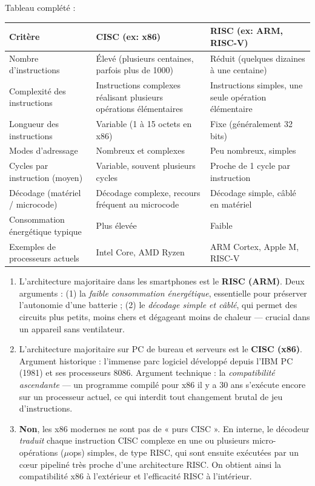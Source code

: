 \documentclass[11pt]{article}
\newcommand{\cle}[1]{{\popxbold\color{popdark}#1}}
\begin{document}
\begin{corrige}
Tableau complété :
\begin{center}
\begin{tabularx}{\linewidth}{|l|X|X|}
\hline
\rowcolor{popblueL}
\textbf{Critère} & \textbf{CISC (ex: x86)} & \textbf{RISC (ex: ARM, RISC-V)} \\ \hline
Nombre d'instructions & Élevé (plusieurs centaines, parfois plus de 1000) & Réduit (quelques dizaines à une centaine) \\ \hline
Complexité des instructions & Instructions complexes réalisant plusieurs opérations élémentaires & Instructions simples, une seule opération élémentaire \\ \hline
Longueur des instructions & Variable (1 à 15 octets en x86) & Fixe (généralement 32 bits) \\ \hline
Modes d'adressage & Nombreux et complexes & Peu nombreux, simples \\ \hline
Cycles par instruction (moyen) & Variable, souvent plusieurs cycles & Proche de 1 cycle par instruction \\ \hline
Décodage (matériel / microcode) & Décodage complexe, recours fréquent au microcode & Décodage simple, câblé en matériel \\ \hline
Consommation énergétique typique & Plus élevée & Faible \\ \hline
Exemples de processeurs actuels & Intel Core, AMD Ryzen & ARM Cortex, Apple M, RISC-V \\ \hline
\end{tabularx}
\end{center}
\begin{enumerate}
    \item L'architecture majoritaire dans les smartphones est le \textbf{RISC (ARM)}. Deux arguments : (1) la \emph{faible consommation énergétique}, essentielle pour préserver l'autonomie d'une batterie ; (2) le \emph{décodage simple et câblé}, qui permet des circuits plus petits, moins chers et dégageant moins de chaleur — crucial dans un appareil sans ventilateur.
    \item L'architecture majoritaire sur PC de bureau et serveurs est le \textbf{CISC (x86)}. Argument historique : l'immense parc logiciel développé depuis l'IBM PC (1981) et ses processeurs 8086. Argument technique : la \emph{compatibilité ascendante} — un programme compilé pour x86 il y a 30 ans s'exécute encore sur un processeur actuel, ce qui interdit tout changement brutal de jeu d'instructions.
    \item \textbf{Non}, les x86 modernes ne sont pas de « purs CISC ». En interne, le décodeur \emph{traduit} chaque instruction CISC complexe en une ou plusieurs \cle{micro-opérations} ($\mu$ops) simples, de type RISC, qui sont ensuite exécutées par un cœur pipeliné très proche d'une architecture RISC. On obtient ainsi la compatibilité x86 à l'extérieur et l'efficacité RISC à l'intérieur.
\end{enumerate}
\end{corrige}
\end{document}
